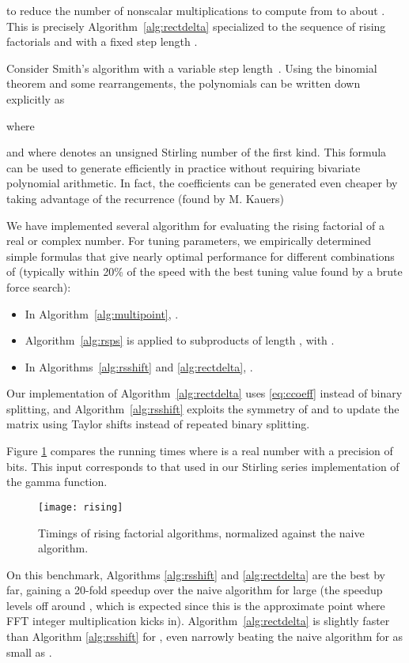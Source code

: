 \documentclass{sig-alternate}
\begin{document}
to reduce the number of nonscalar multiplications to compute  from 
to about . This is precisely Algorithm~\ref{alg:rectdelta}
specialized to the sequence of rising factorials and with a fixed step length .

Consider Smith's algorithm with a variable step length~.
Using the binomial theorem and some rearrangements,
the polynomials can be written down explicitly as

where

and where  denotes an unsigned Stirling number of the first kind.
This formula can be used to generate  efficiently in practice without
requiring bivariate polynomial arithmetic. In fact, the coefficients can
be generated even cheaper by taking advantage of the recurrence (found by
M. Kauers)


We have implemented several algorithm for evaluating the rising
factorial of a real or complex number.
For tuning parameters, we empirically determined simple
formulas that give nearly optimal
performance for different combinations of 
(typically within 20\% of the speed with the best tuning
value found by a brute force search):
\begin{itemize}
\item In Algorithm~\ref{alg:multipoint}, .
\item Algorithm~\ref{alg:rsps} is applied to subproducts of length , with .
\item In Algorithms~\ref{alg:rsshift} and \ref{alg:rectdelta}, .
\end{itemize}

Our implementation of Algorithm~\ref{alg:rectdelta} uses \eqref{eq:ccoeff}
instead of binary splitting, and Algorithm~\ref{alg:rsshift}
exploits the symmetry of  and  to update the
matrix  using Taylor shifts instead of repeated binary splitting.

Figure \ref{fig:rising} compares the running times where 
is a real number with a precision of  bits. This input
corresponds to that used in our Stirling series implementation
of the gamma function.

\begin{figure}[width=8cm] \label{fig:rising}
\begin{center}
\texttt{[image: rising]}
\caption{Timings of rising factorial algorithms, normalized
against the naive algorithm.}
\end{center}
\end{figure}

On this benchmark, Algorithms \ref{alg:rsshift} and \ref{alg:rectdelta} are the
best by far, gaining a 20-fold speedup over the naive algorithm for large 
(the speedup levels off
around , which is expected since this is
the approximate point where FFT integer multiplication kicks in).
Algorithm~\ref{alg:rectdelta} is slightly faster than Algorithm \ref{alg:rsshift}
for , even narrowly beating the naive algorithm for
 as small as .
\end{document}
